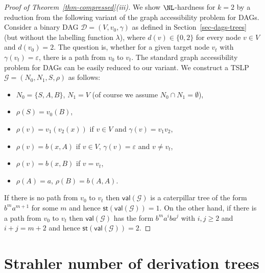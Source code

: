 \documentclass[a4paper,UKenglish,cleveref, autoref, thm-restate, numberwithinsect]{lipics-v2021}
\newcommand{\val}{\mathsf{val}}
\newcommand{\hs}{\mathsf{st}}
\begin{document}
\begin{proof}[Proof of Theorem~\ref{thm-compressed}(iii)]
We show $\NL$-hardness for $k=2$ by a reduction from the following variant of the graph accessibility problem for DAGs.
Consider a binary DAG $\mathcal{D} = (V, v_0, \gamma)$ as defined in Section~\ref{sec-dags-trees} 
(but without the labelling function $\lambda$), where
$d(v) \in \{0,2\}$ for every node $v \in V$ and $d(v_0)=2$. The question is, whether for a given target node $v_t$ 
with $\gamma(v_t) = \varepsilon$, there
is a path from $v_0$ to $v_t$. The standard graph accessibility problem for DAGs can be easily reduced to our variant.
We construct a TSLP $\mathcal{G} = (N_0, N_1, S, \rho)$ as follows:
\begin{itemize}
\item $N_0 = \{ S, A, B \}$, $N_1 = V$ (of course we assume $N_0 \cap N_1 = \emptyset$),
\item $\rho(S) = v_0(B)$,
\item $\rho(v) =  v_1(v_2(x))$ if $v \in V$ and $\gamma(v) = v_1 v_2$,
\item $\rho(v) = b(x, A)$ if $v \in V$, $\gamma(v) = \varepsilon$ and $v \neq v_t$,
\item $\rho(v) = b(x, B)$ if  $v = v_t$,
\item $\rho(A) = a$, $\rho(B) = b(A,A)$.
\end{itemize}
If there is no path from $v_0$ to $v_t$ then $\val(\mathcal{G})$ is a caterpillar tree of the form
$b^m a^{m+1}$ for some $m$ and hence $\hs(\val(\mathcal{G})) = 1$. On the other hand, if 
there is a path from $v_0$ to $v_t$ then $\val(\mathcal{G})$ has the form $b^m a^i b a^j$ 
with $i,j \ge 2$ and $i+j = m+2$ and hence $\hs(\val(\mathcal{G})) = 2$.
\end{proof}





\section{Strahler number of derivation trees} \label{sec-CNF}
\end{document}
